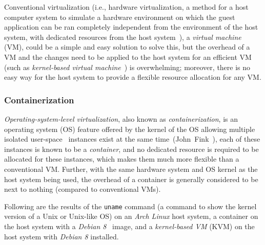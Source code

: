 Conventional virtualization (i.e., hardware virtualization, a method for a
host computer system to simulate a hardware environment on which the guest
application can be ran completely independent from the environment of the host
system, with dedicated resources from the host system~\citep[Chap.~16]{os}),
a \emph{virtual machine} (VM), could be a simple and easy solution to solve
this, but the overhead of a VM and the changes need to be applied to the host
system for an efficient VM (such as 
\emph{kernel-based virtual machine}~\cite{kvm}) is overwhelming;
moreover, there is no easy way for the host system to provide a flexible
resource allocation for any VM.

\subsubsection{Containerization}
\emph{Operating-system-level virtualization}, also known as
\emph{containerization}, is an operating system (OS) feature offered by the
kernel of the OS allowing multiple isolated user-space~\citep[Sec.~1.5.1]{os}
instances exist at the same time~(John~Fink~\cite{docker}),
each of these instances is known to be a \emph{container}, and no dedicated resource
is required to be allocated for these instances, which makes them much more
flexible than a conventional VM. Further, with the same hardware system and
OS kernel as the host system being used, the overhead of a container is
generally considered to be next to nothing (compared to conventional VMs).

\pagebreak

Following are the results of the \texttt{uname} command
(a command to show the kernel version of a Unix or Unix-like OS)
on an \emph{Arch Linux} host system, a container on the host system
with a \emph{Debian 8}~\cite{debian} image, and a \emph{kernel-based VM} (KVM)
on the host system with \emph{Debian 8} installed.

\begin{centering}



\end{centering}

